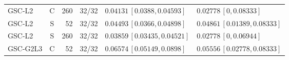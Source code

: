 \begin{longtable}{lcrcp{44mm}p{44mm}}
GSC-L2 & C & 260 & 32/32 & \(0.04131\,[0.0388,0.04593]\) & \(0.02778\,[0,0.08333]\)\\
GSC-L2 & S & 52 & 32/32 & \(0.04493\,[0.0366,0.04898]\) & \(0.04861\,[0.01389,0.08333]\)\\
GSC-L2 & S & 260 & 32/32 & \(0.03859\,[0.03435,0.04521]\) & \(0.02778\,[0,0.06944]\)\\
GSC-G2L3 & C & 52 & 32/32 & \(0.06574\,[0.05149,0.0898]\) & \(0.05556\,[0.02778,0.08333]\)\\

\end{longtable}
